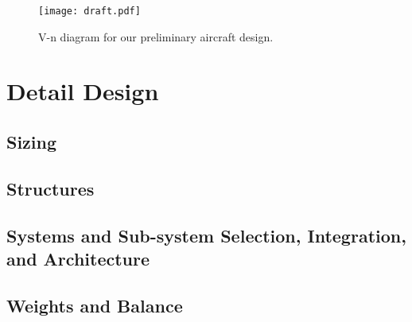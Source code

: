 \documentclass[report]{byu-aero}
\begin{document}
\begin{figure}[h!]
	\centering
	\texttt{[image: draft.pdf]}
	\caption{V-n diagram for our preliminary aircraft design.}
	\label{fig:vndiagram}
\end{figure}



\section{Detail Design} %
\label{sec:detaildesign}




\subsection{Sizing}
\label{ssec:sizing}




\subsection{Structures}
\label{ssec:structures}




\subsection{Systems and Sub-system Selection, Integration, and Architecture}
\label{ssec:systemdetails}




\subsection{Weights and Balance}
\label{ssec:weightsandbalance}
\end{document}
